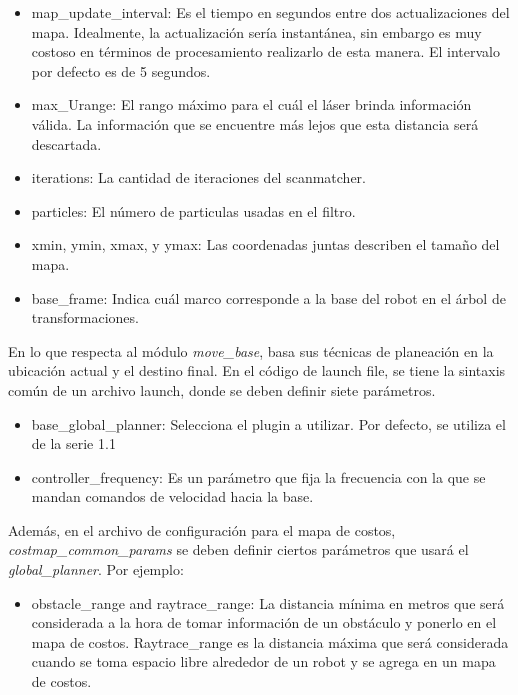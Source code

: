 \begin{itemize}
\item map\_update\_interval: Es el tiempo en segundos entre dos actualizaciones del mapa. Idealmente, la actualización sería instantánea, sin embargo es muy costoso en términos de procesamiento realizarlo de esta manera. El intervalo por defecto es de 5 segundos.

\item max\_Urange: El rango máximo para el cuál el láser brinda información válida. La información que se encuentre más lejos que esta distancia será descartada.

\item iterations: La cantidad de iteraciones del scanmatcher.

\item particles: El número de particulas usadas en el filtro.

\item xmin, ymin, xmax, y ymax: Las coordenadas juntas describen el tamaño del mapa.

\item base\_frame: Indica cuál marco corresponde a la base del robot en el árbol de transformaciones.

\end{itemize}

En lo que respecta al módulo \textit{move\_base}, basa sus técnicas de planeación en la ubicación actual y el destino final. En el código de launch file, se tiene la sintaxis común de un archivo launch, donde se deben definir siete parámetros.

\begin{itemize}

\item base\_global\_planner: Selecciona el plugin a utilizar. Por defecto, se utiliza el de la serie 1.1

\item controller\_frequency: Es un parámetro que fija la frecuencia con la que se mandan comandos de velocidad hacia la base.

\end{itemize}

Además, en el archivo de configuración para el mapa de costos, \textit{costmap\_common\_params} se deben definir ciertos parámetros que usará el \textit{global\_planner}. Por ejemplo:

\begin{itemize}
\item obstacle\_range and raytrace\_range: La distancia mínima en metros que será considerada a la hora de tomar información de un obstáculo y ponerlo en el mapa de costos. Raytrace\_range es la distancia máxima que será considerada cuando se toma espacio libre alrededor de un robot y se agrega en un mapa de costos.

\end{itemize}


